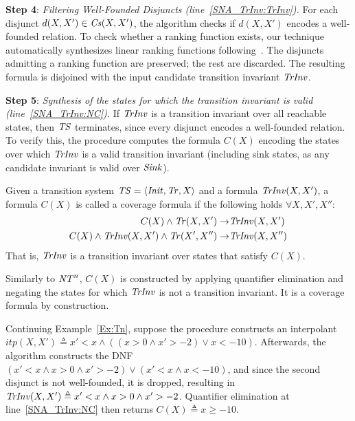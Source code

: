 \textbf{Step 4}: \textit{Filtering Well-Founded Disjuncts (line~\ref{SNA_TrInv:TrInv}).}
For each disjunct $d(X,X') \in \mathit{Cs}(X,X')$, the algorithm checks if $d(X,X')$ encodes a well-founded relation.
To check whether a ranking function exists, our technique automatically synthesizes linear ranking functions following~\cite{DBLP:conf/vmcai/PodelskiR04}.
The disjuncts admitting a ranking function are preserved; the rest are discarded.
The resulting formula is disjoined with the input candidate transition invariant $\mathit{TrInv}$.

\textbf{Step 5}: \textit{Synthesis of the states for which the transition invariant is valid (line~\ref{SNA_TrInv:NC}).}
If $\mathit{TrInv}$ is a transition invariant over all reachable states, then $\mathit{TS}$ terminates, since every disjunct encodes a well-founded relation.
To verify this, the procedure computes the formula $C(X)$ encoding the states over which $\mathit{TrInv}$ is a valid transition invariant (including sink states, as any candidate invariant is valid over $\mathit{Sink}$).
\begin{definition}
    Given a transition system $\mathit{TS} = \langle \mathit{Init}, \mathit{Tr}, X \rangle$ and a formula $\mathit{TrInv}(X,X')$, 
    a formula $C(X)$ is called a coverage formula if the following holds $\forall X, X',X''$:
    \begin{align*}
     C(X) \land \mathit{Tr}(X,X') \rightarrow& \mathit{TrInv}(X,X') \\
     C(X) \land \mathit{TrInv}(X,X') \land \mathit{Tr}(X',X'') \rightarrow& \mathit{TrInv}(X,X'')
    \end{align*}
 That is, $\mathit{TrInv}$ is a transition invariant over states that satisfy $C(X)$.
\end{definition}

Similarly to $\mathit{NT}^{n}$, $C(X)$ is constructed by applying quantifier elimination and negating the states for
which $\mathit{TrInv}$ is not a transition invariant. It is a coverage formula by construction.
\begin{example}\label{Ex:C}
    Continuing Example~\ref{Ex:Tn}, suppose the procedure constructs an interpolant
    $itp(X,X') \triangleq x' < x \land ( (x > 0 \land x' > -2) \lor x < -10)$. 
    Afterwards, the algorithm constructs the DNF $(x' < x \land x > 0 \land x' > -2 ) \lor (x' < x \land x < -10 )$, and
    since the second disjunct is not well-founded, it is dropped, resulting in $\mathit{TrInv}(X,X') \triangleq x' < x \land x > 0 \land x' > -2$. 
    Quantifier elimination at line~\ref{SNA_TrInv:NC} then returns $C(X) \triangleq x \geq -10$.
\end{example}

